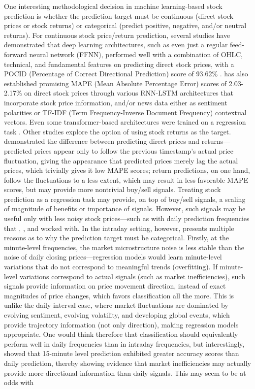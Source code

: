 \documentclass[stu,floatsintext]{apa7}
\begin{document}
One interesting methodological decision in machine learning-based stock prediction is whether the prediction target must be continuous (direct stock prices or stock returns) or categorical (predict positive, negative, and/or neutral returns). For continuous stock price/return prediction, several studies have demonstrated that deep learning architectures, such as even just a regular feed-forward neural network (FFNN), performed well with a combination of OHLC, technical, and fundamental features on predicting direct stock prices, with a POCID (Percentage of Correct Directional Prediction) score of 93.62\% \parencite{deoliveira2013applying}. \textcite{mohan2019stock} has also established promising MAPE (Mean Absolute Percentage Error) scores of 2.03-2.17\% on direct stock prices through various RNN-LSTM architectures that incorporate stock price information, and/or news data either as sentiment polarities or TF-IDF (Term Frequency-Inverse Document Frequency) contextual vectors. Even some transformer-based architectures were trained on a regression task \textcite{li2025transformer}. Other studies explore the option of using stock returns as the target. \textcite{shen2015forecasting} demonstrated the difference between predicting direct prices and returns—predicted prices appear only to follow the previous timestamp’s actual price fluctuation, giving the appearance that predicted prices merely lag the actual prices, which trivially gives it low MAPE scores; return predictions, on one hand, follow the fluctuations to a less extent, which may result in less favorable MAPE scores, but may provide more nontrivial buy/sell signals. Treating stock prediction as a regression task may provide, on top of buy/sell signals, a scaling of magnitude of benefits or importance of signals. However, such signals may be useful only with less noisy stock prices—such as with daily prediction frequencies that \textcite{deoliveira2013applying}, \textcite{mohan2019stock}, and \textcite{shen2015forecasting} worked with. In the intraday setting, however, \textcite{zaznov2024intraday} presents multiple reasons as to why the prediction target must be categorical. Firstly, at the minute-level frequencies, the market microstructure noise is less stable than the noise of daily closing prices—regression models would learn minute-level variations that do not correspond to meaningful trends (overfitting). If minute-level variations correspond to actual signals (such as market inefficiencies), such signals provide information on price movement direction, instead of exact magnitudes of price changes, which favors classification all the more. This is unlike the daily interval case, where market fluctuations are dominated by evolving sentiment, evolving volatility, and developing global events, which provide trajectory information (not only direction), making regression models appropriate. One would think therefore that classification should equivalently perform well in daily frequencies than in intraday frequencies, but interestingly, \textcite{khan2023performance} showed that 15-minute level prediction exhibited greater accuracy scores than daily prediction, thereby showing evidence that market inefficiencies may actually provide more directional information than daily signals. This may seem to be at odds with 
\end{document}

